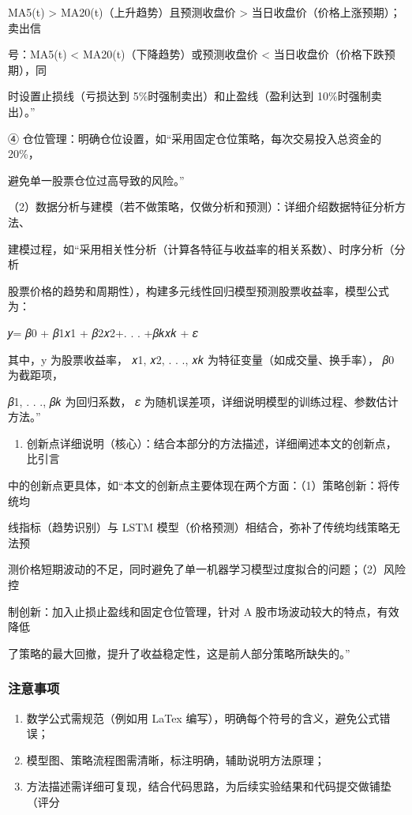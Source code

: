 \documentclass[
]{article}
\providecommand{\tightlist}{%
  \setlength{\itemsep}{0pt}\setlength{\parskip}{0pt}}
\begin{document}
MA5(t) \textgreater{} MA20(t)（上升趋势）且预测收盘价 \textgreater{}
当日收盘价（价格上涨预期）；卖出信

号：MA5(t) \textless{} MA20(t)（下降趋势）或预测收盘价 \textless{}
当日收盘价（价格下跌预期），同

时设置止损线（亏损达到 5\%时强制卖出）和止盈线（盈利达到
10\%时强制卖出）。''

④ 仓位管理：明确仓位设置，如``采用固定仓位策略，每次交易投入总资金的
20\%，

避免单一股票仓位过高导致的风险。''

（2）数据分析与建模（若不做策略，仅做分析和预测）：详细介绍数据特征分析方法、

建模过程，如``采用相关性分析（计算各特征与收益率的相关系数）、时序分析（分析

股票价格的趋势和周期性），构建多元线性回归模型预测股票收益率，模型公式为：

𝑦= 𝛽0 + 𝛽1𝑥1 + 𝛽2𝑥2+. . . +𝛽𝑘𝑥𝑘 + 𝜀

其中，y 为股票收益率， 𝑥1, 𝑥2, . . ., 𝑥𝑘
为特征变量（如成交量、换手率）， 𝛽0 为截距项，

𝛽1, . . ., 𝛽𝑘 为回归系数， 𝜀
为随机误差项，详细说明模型的训练过程、参数估计方法。''

\begin{enumerate}
\def\labelenumi{\arabic{enumi}.}
\setcounter{enumi}{3}
\tightlist
\item
  创新点详细说明（核心）：结合本部分的方法描述，详细阐述本文的创新点，比引言
\end{enumerate}

中的创新点更具体，如``本文的创新点主要体现在两个方面：（1）策略创新：将传统均

线指标（趋势识别）与 LSTM
模型（价格预测）相结合，弥补了传统均线策略无法预

测价格短期波动的不足，同时避免了单一机器学习模型过度拟合的问题；（2）风险控

制创新：加入止损止盈线和固定仓位管理，针对 A
股市场波动较大的特点，有效降低

了策略的最大回撤，提升了收益稳定性，这是前人部分策略所缺失的。''

\hypertarget{ux6ce8ux610fux4e8bux9879-3}{%
\subsubsection{\texorpdfstring{\textbf{注意事项}}{注意事项}}\label{ux6ce8ux610fux4e8bux9879-3}}

\begin{enumerate}
\def\labelenumi{\arabic{enumi}.}
\item
  数学公式需规范（例如用 LaTex
  编写），明确每个符号的含义，避免公式错误；
\item
  模型图、策略流程图需清晰，标注明确，辅助说明方法原理；
\item
  方法描述需详细可复现，结合代码思路，为后续实验结果和代码提交做铺垫（评分
\end{enumerate}
\end{document}
